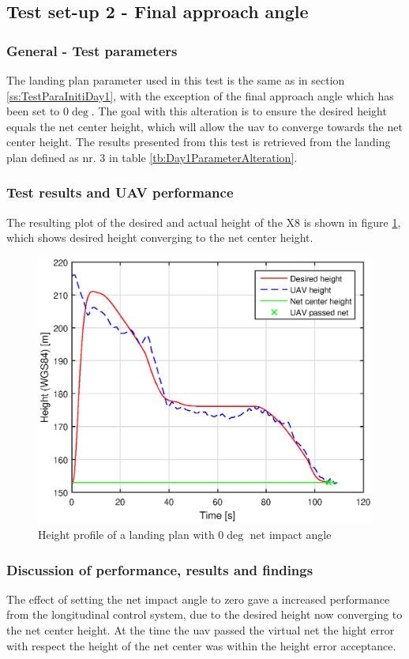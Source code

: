 \subsection{Test set-up 2 - Final approach angle}\label{ss:Day1FinalApp}
\subsubsection{General - Test parameters}
The landing plan parameter used in this test is the same as in section \ref{ss:TestParaInitiDay1}, with the exception of the final approach angle which has been set to $0 \deg$. The goal with this alteration is to ensure the desired height equals the net center height, which will allow the \gls{uav} to converge towards the net center height. The results presented from this test is retrieved from the landing plan defined as nr. 3 in table \ref{tb:Day1ParameterAlteration}.
\subsubsection{Test results and UAV performance}
The resulting plot of the desired and actual height of the X8 is shown in figure \ref{Fig:Height31mai31mai105034}, which shows desired height converging to the net center height.
\begin{figure}[H]
\centering
		\includegraphics[scale=0.7]{figs/Experiment/Height31mai105034.eps}
		\caption{Height profile of a landing plan with $0 \deg$ net impact angle}
		\label{Fig:Height31mai31mai105034}
\end{figure}
\subsubsection{Discussion of performance, results and findings}
The effect of setting the net impact angle to zero gave a increased performance from the longitudinal control system, due to the desired height now converging to the net center height. At the time the \gls{uav} passed the virtual net the hight error with respect the height of the net center was within the height error acceptance.
